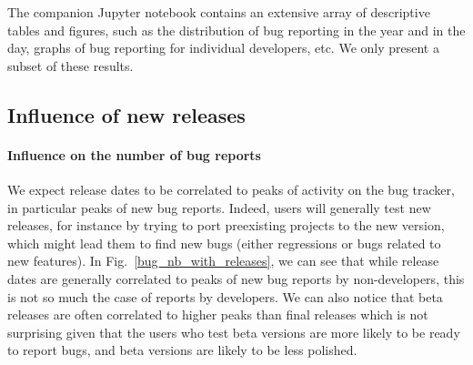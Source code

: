 \documentclass[conference]{IEEEtran}
\begin{document}
The companion Jupyter notebook contains an extensive array of descriptive tables and figures, such as the distribution of bug reporting in the year and in the day, graphs of bug reporting for individual developers, etc. We only present a subset of these results.





\subsection{Influence of new releases}
\label{influence_release}

\paragraph{Influence on the number of bug reports}
We expect release dates to be correlated to peaks of activity on the bug tracker, in particular peaks of new bug reports. Indeed, users will generally test new releases, for instance by trying to port preexisting projects to the new version, which might lead them to find new bugs (either regressions or bugs related to new features). In Fig.~\ref{bug_nb_with_releases}, we can see that while release dates are generally correlated to peaks of new bug reports by non-developers, this is not so much the case of reports by developers. We can also notice that beta releases are often correlated to higher peaks than final releases which is not surprising given that the users who test beta versions are more likely to be ready to report bugs, and beta versions are likely to be less polished.
\end{document}
